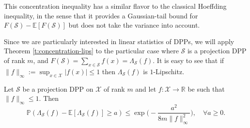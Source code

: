 \begin{comment}
    The SCP property is crucial in this approach. In particular, the authors decomposed $F(\mathcal S) - \mathbb E [F(\mathcal S)]$ as a martingale, and the bounded differences property was verified using the SCP and the Lipschitz of $F$. The concentration inequality follows from the classical Azuma-Hoeffding inequality.
\end{comment}
This concentration inequality has a similar flavor to the classical Hoeffding inequality, in the sense that it provides a Gaussian-tail bound for $F(\mathcal S) - \mathbb E[F(\mathcal S)]$ but does not take the variance into account. 

Since we are particularly interested in linear statistics of DPPs, we will apply Theorem \ref{t:concentration-lips} to the particular case where $\mathcal S$ is a projection DPP of rank $m$, and $F(\mathcal S) = \sum_{x\in \mathcal S} f(x) = \Lambda_{\mathcal S}(f)$. It is easy to see that if $\|f\|_\infty := \sup_{x\in \mathcal X}|f(x)|\le 1$ then $\Lambda_{\mathcal S}(f)$ is $1$-Lipschitz.

\begin{corollary} \label{c:concentration-lips}
    Let $\mathcal S$ be a projection DPP on $\mathcal X$ of rank $m$ and let $f:\mathcal X\rightarrow \mathbb R$ be such that $\|f\|_\infty \le 1$. Then
    \[\mathbb P(\Lambda_{\mathcal S}(f) - \mathbb E[\Lambda_{\mathcal S}(f)] \ge a ) \le \exp \Big (-\frac{a^2}{8m \|f\|_\infty^2}\Big), \quad \forall a \ge 0.\]
\end{corollary}

